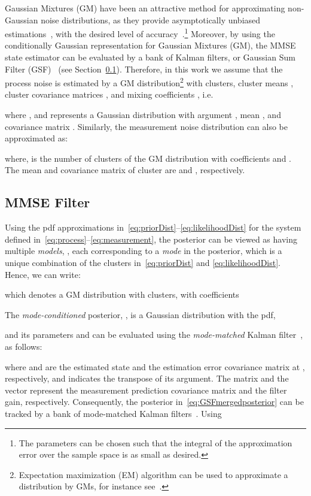 \documentclass[10pt,twocolumn,twoside]{IEEEtran}
\newcommand{\corcol}[1]{\textcolor{CorCol}{#1}}
\begin{document}
Gaussian Mixtures (GM) have been an attractive method for approximating non-Gaussian noise distributions, as they provide asymptotically unbiased estimations~\cite{1962KernelDensityEstimation}, with the desired level of accuracy~\cite{anderson1979optimal}.\footnote{The parameters can be chosen such that the integral of the approximation error over the sample space is as small as desired.} Moreover, by using the conditionally Gaussian representation for Gaussian Mixtures (GM), the MMSE state estimator can be evaluated by a bank of Kalman filters, or Gaussian Sum Filter (GSF)~\cite{bar2001estimation,ackerson_state_1970} (see Section~\ref{sec:GSF}). Therefore, in this work we assume that the process noise is estimated by a GM distribution\footnote{\corcol{Expectation maximization (EM) algorithm can be used to approximate a distribution by GMs, for instance see~\cite{mclachlan2004finite}.}} with  clusters, cluster means , cluster covariance matrices , and mixing coefficients , i.e. 

where , and  represents a Gaussian distribution with argument , mean , and covariance matrix . Similarly, the measurement noise distribution can also be approximated as:

where,  is the number of clusters of the GM distribution with coefficients  and . The mean and covariance matrix of cluster  are  and , respectively. 

\subsection{MMSE Filter}
\label{sec:GSF}
Using the pdf approximations in~\eqref{eq:priorDist}--\eqref{eq:likelihoodDist} for the system defined in~\eqref{eq:process}--\eqref{eq:measurement}, the posterior can be viewed as having multiple \textit{models}, , each corresponding to a \textit{mode} in the posterior, which is a unique combination of the clusters in~\eqref{eq:priorDist} and \eqref{eq:likelihoodDist}. Hence, we can write:

which denotes a GM distribution with  clusters, with coefficients

The \textit{mode-conditioned} posterior, , is a Gaussian distribution with the pdf,

and its parameters  and  can be evaluated using the \textit{mode-matched} Kalman filter~\cite{ho_bayesian_1964,bar2001estimation}, as follows:

where  and  are the  estimated state and the estimation error covariance matrix at , respectively, and  indicates the transpose of its argument. \corcol{The matrix  and the vector  represent the measurement prediction covariance matrix and the filter gain, respectively.}
Consequently, the posterior in~\eqref{eq:GSFmergedposterior} can be tracked by a bank of  mode-matched Kalman filters~\cite{anderson1979optimal,bar2001estimation}. Using
\end{document}
